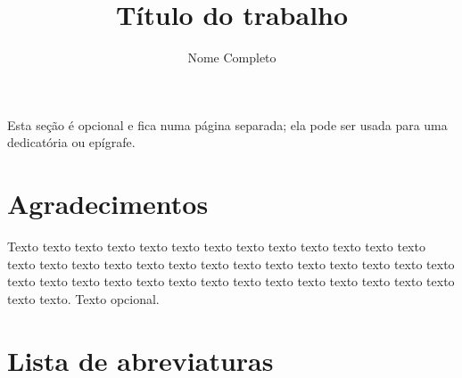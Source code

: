 \documentclass[a4paper,12pt,twoside,brazilian,english]{book}
\title{Título do trabalho}[um subtítulo]
\author[fem]{Nome Completo}
\begin{document}

\frontmatter

\pagestyle{plain}

\onehalfspacing %

\maketitle %


\begin{dedicatoria}
    Esta seção é opcional e fica numa página separada; ela pode ser usada para
    uma dedicatória ou epígrafe.
\end{dedicatoria}



\chapter*{Agradecimentos}

Texto texto texto texto texto texto texto texto texto texto texto texto texto
texto texto texto texto texto texto texto texto texto texto texto texto texto
texto texto texto texto texto texto texto texto texto texto texto texto texto
texto texto texto texto. Texto opcional.




\cleardoublepage

\newcommand\disablenewpage[1]{{\let\clearpage\par\let\cleardoublepage\par #1}}

\bgroup
\raggedbottom


\disablenewpage{\chapter*{Lista de abreviaturas}}
\end{document}

